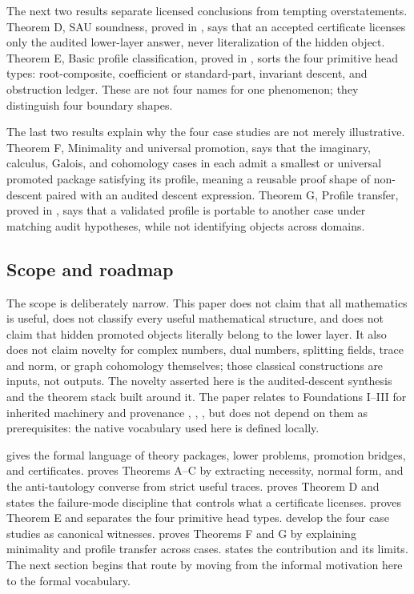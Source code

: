 \documentclass[11pt]{article}
\newcommand{\citeFoundationsI}{\citep{TsiokosMathTheory}}
\newcommand{\citeFoundationsII}{\citep{TsiokosFoundationsII}}
\newcommand{\citeFoundationsIII}{\citep{TsiokosFoundationsIII}}
\theoremstyle{definition}
\begin{document}
The next two results separate licensed conclusions from tempting
overstatements.  Theorem D, SAU soundness, proved in
, says that an accepted certificate licenses only
the audited lower-layer answer, never literalization of the hidden object.
Theorem E, Basic profile classification, proved in ,
sorts the four primitive head types: root-composite, coefficient or
standard-part, invariant descent, and obstruction ledger.  These are not four
names for one phenomenon; they distinguish four boundary shapes.

The last two results explain why the four case studies are not merely
illustrative.  Theorem F, Minimality and universal promotion, says that the
imaginary, calculus, Galois, and cohomology cases in
 each admit a
smallest or universal promoted package satisfying its profile, meaning a
reusable proof shape of non-descent paired with an audited descent expression.
Theorem G, Profile transfer, proved in , says that a
validated profile is portable to another case under matching audit hypotheses,
while not identifying objects across domains.

\subsection{Scope and roadmap}
\label{subsec:intro-scope-roadmap}

The scope is deliberately narrow.  This paper does not claim that all
mathematics is useful, does not classify every useful mathematical structure,
and does not claim that hidden promoted objects literally belong to the lower
layer.  It also does not claim novelty for complex numbers, dual numbers,
splitting fields, trace and norm, or graph cohomology themselves; those
classical constructions are inputs, not outputs.  The novelty asserted here is
the audited-descent synthesis and the theorem stack built around it.  The
paper relates to Foundations I--III for inherited machinery and provenance
\citeFoundationsI, \citeFoundationsII, \citeFoundationsIII, but does not
depend on them as prerequisites: the native vocabulary used here is defined
locally.

 gives the formal language of theory packages, lower
problems, promotion bridges, and certificates.   proves
Theorems A--C by extracting necessity, normal form, and the anti-tautology
converse from strict useful traces.   proves
Theorem D and states the failure-mode discipline that controls what a
certificate licenses.   proves Theorem E and
separates the four primitive head types.
 develop the four
case studies as canonical witnesses.   proves Theorems F
and G by explaining minimality and profile transfer across cases.
 states the contribution and its limits.  The next section
begins that route by moving from the informal motivation here to the formal
vocabulary.
\end{document}
